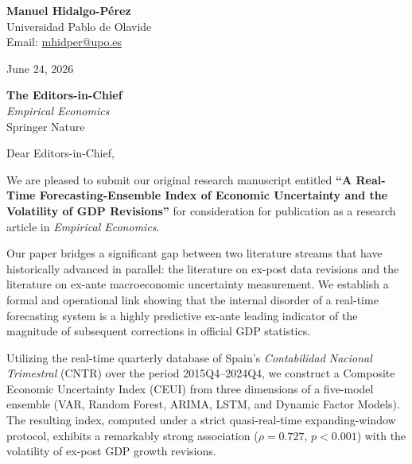 \documentclass[12pt]{article}
\begin{document}
\begin{flushleft}
\textbf{Manuel Hidalgo-Pérez} \\
Universidad Pablo de Olavide \\
Email: \href{mailto:mhidper@upo.es}{mhidper@upo.es} \\
\end{flushleft}

\vspace{1cm}

\begin{flushright}
June 24, 2026
\end{flushright}

\vspace{0.5cm}

\begin{flushleft}
\textbf{The Editors-in-Chief} \\
\textit{Empirical Economics} \\
Springer Nature \\
\end{flushleft}

\vspace{1cm}

\noindent Dear Editors-in-Chief,

\vspace{0.5cm}

\noindent We are pleased to submit our original research manuscript entitled \textbf{``A Real-Time Forecasting-Ensemble Index of Economic Uncertainty and the Volatility of GDP Revisions''} for consideration for publication as a research article in \textit{Empirical Economics}.

\vspace{0.5cm}

\noindent Our paper bridges a significant gap between two literature streams that have historically advanced in parallel: the literature on ex-post data revisions and the literature on ex-ante macroeconomic uncertainty measurement. We establish a formal and operational link showing that the internal disorder of a real-time forecasting system is a highly predictive ex-ante leading indicator of the magnitude of subsequent corrections in official GDP statistics. 

\noindent Utilizing the real-time quarterly database of Spain's \textit{Contabilidad Nacional Trimestral} (CNTR) over the period 2015Q4--2024Q4, we construct a Composite Economic Uncertainty Index (CEUI) from three dimensions of a five-model ensemble (VAR, Random Forest, ARIMA, LSTM, and Dynamic Factor Models). The resulting index, computed under a strict quasi-real-time expanding-window protocol, exhibits a remarkably strong association ($\rho = 0.727$, $p < 0.001$) with the volatility of ex-post GDP growth revisions. 
\end{document}
